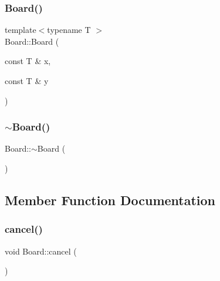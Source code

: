 \subsubsection{\texorpdfstring{Board()}{Board()}\hspace{0.1cm}{\footnotesize\ttfamily [3/3]}}
{\footnotesize\ttfamily template$<$typename T $>$ \\
Board\+::\+Board (\begin{DoxyParamCaption}\item[{const T \&}]{x,  }\item[{const T \&}]{y }\end{DoxyParamCaption})}

\mbox{\label{class_board_af73f45730119a1fd8f6670f53f959e68}} 
\subsubsection{\texorpdfstring{$\sim$\+Board()}{~Board()}}
{\footnotesize\ttfamily Board\+::$\sim$\+Board (\begin{DoxyParamCaption}{ }\end{DoxyParamCaption})}



\subsection{Member Function Documentation}
\mbox{\label{class_board_ac7ec911a62371650afd340d1535a1742}} 
\subsubsection{\texorpdfstring{cancel()}{cancel()}}
{\footnotesize\ttfamily void Board\+::cancel (\begin{DoxyParamCaption}{ }\end{DoxyParamCaption})}

